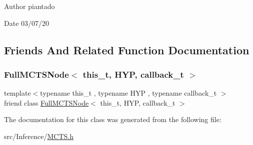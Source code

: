\begin{DoxyAuthor}{Author}
piantado 
\end{DoxyAuthor}
\begin{DoxyDate}{Date}
03/07/20 
\end{DoxyDate}


\subsection{Friends And Related Function Documentation}
\mbox{\label{class_partial_m_c_t_s_node_a6f119b2294000202fb5eaa562a7aa52b}} 
\subsubsection{\texorpdfstring{Full\+M\+C\+T\+S\+Node$<$ this\+\_\+t, H\+Y\+P, callback\+\_\+t $>$}{FullMCTSNode< this\_t, HYP, callback\_t >}}
{\footnotesize\ttfamily template$<$typename this\+\_\+t , typename H\+YP , typename callback\+\_\+t $>$ \\
friend class \hyperlink{class_full_m_c_t_s_node}{Full\+M\+C\+T\+S\+Node}$<$ this\+\_\+t, H\+YP, callback\+\_\+t $>$\hspace{0.3cm}{\ttfamily [friend]}}



The documentation for this class was generated from the following file\+:\begin{DoxyCompactItemize}
\item 
src/\+Inference/\hyperlink{_m_c_t_s_8h}{M\+C\+T\+S.\+h}\end{DoxyCompactItemize}
